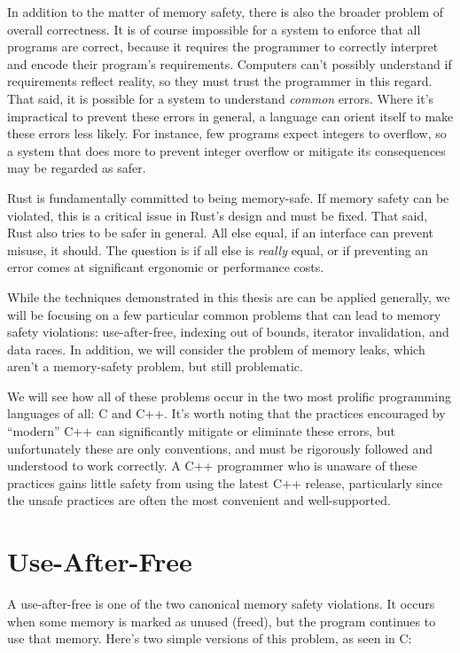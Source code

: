 In addition to the matter of memory safety, there is also the broader problem
of overall correctness. It is of course impossible for a system to enforce
that all programs are correct, because it requires the programmer to
correctly interpret and encode their program's requirements. Computers can't
possibly understand if requirements reflect reality, so they must trust the
programmer in this regard. That said, it is possible for a system to understand
\emph{common} errors. Where it's impractical to prevent these errors in general,
a language can orient itself to make these errors less likely. For instance,
few programs expect integers to overflow, so a system that does more to prevent
integer overflow or mitigate its consequences may be regarded as safer.

Rust is fundamentally committed to being memory-safe. If memory safety can
be violated, this is a critical issue in Rust's design and must be fixed. That said,
Rust also tries to be safer in general. All else equal, if an interface can
prevent misuse, it should. The question is if all else is
\emph{really} equal, or if preventing an error comes at significant ergonomic or
performance costs.

While the techniques demonstrated in this thesis are can be applied generally,
we will be focusing on a few particular common problems that can lead to
memory safety violations: use-after-free, indexing out of bounds,
iterator invalidation, and data races. In addition, we will consider the problem of
memory leaks, which aren't a memory-safety problem, but still problematic.

We will see how all of these problems occur in the two most prolific programming
languages of all: C and C++. It's worth noting that the practices encouraged
by ``modern'' C++ can significantly mitigate or eliminate these errors, but
unfortunately these are only conventions, and must be rigorously followed
and understood to work correctly. A C++ programmer who is unaware of these
practices gains little safety from using the latest C++ release, particularly
since the unsafe practices are often the most convenient and well-supported.




\section{Use-After-Free}

A use-after-free is one of the two canonical memory safety violations. It
occurs when some memory is marked as unused (freed), but the program
continues to use that memory. Here's two simple versions of this problem, as
seen in C:

